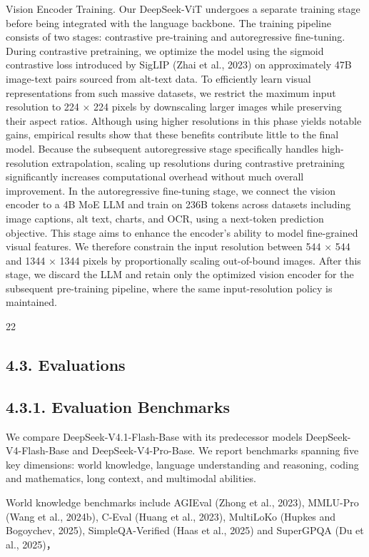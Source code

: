 \documentclass[
  10
]{article}
\begin{document}
Vision Encoder Training. Our DeepSeek-ViT undergoes a separate training
stage before being integrated with the language backbone. The training
pipeline consists of two stages: contrastive pre-training and
autoregressive fine-tuning. During contrastive pretraining, we optimize
the model using the sigmoid contrastive loss introduced by SigLIP (Zhai
et al., 2023) on approximately 47B image-text pairs sourced from
alt-text data. To efficiently learn visual representations from such
massive datasets, we restrict the maximum input resolution to 224 × 224
pixels by downscaling larger images while preserving their aspect
ratios. Although using higher resolutions in this phase yields notable
gains, empirical results show that these benefits contribute little to
the final model. Because the subsequent autoregressive stage
specifically handles high-resolution extrapolation, scaling up
resolutions during contrastive pretraining significantly increases
computational overhead without much overall improvement. In the
autoregressive fine-tuning stage, we connect the vision encoder to a 4B
MoE LLM and train on 236B tokens across datasets including image
captions, alt text, charts, and OCR, using a next-token prediction
objective. This stage aims to enhance the encoder's ability to model
fine-grained visual features. We therefore constrain the input
resolution between 544 × 544 and 1344 × 1344 pixels by proportionally
scaling out-of-bound images. After this stage, we discard the LLM and
retain only the optimized vision encoder for the subsequent pre-training
pipeline, where the same input-resolution policy is maintained.

22

\subsection{4.3. Evaluations}\label{evaluations}

\subsection{4.3.1. Evaluation Benchmarks}\label{evaluation-benchmarks}

We compare DeepSeek-V4.1-Flash-Base with its predecessor models
DeepSeek-V4-Flash-Base and DeepSeek-V4-Pro-Base. We report benchmarks
spanning five key dimensions: world knowledge, language understanding
and reasoning, coding and mathematics, long context, and multimodal
abilities.

World knowledge benchmarks include AGIEval (Zhong et al., 2023),
MMLU-Pro (Wang et al., 2024b), C-Eval (Huang et al., 2023), MultiLoKo
(Hupkes and Bogoychev, 2025), SimpleQA-Verified (Haas et al., 2025) and
SuperGPQA (Du et al., 2025)，
\end{document}
